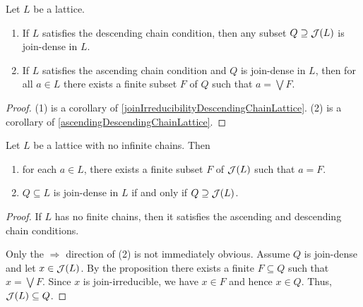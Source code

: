 \begin{proposition}
Let $L$ be a lattice.
\begin{enumerate}
\item If $L$ satisfies the descending chain condition, then any subset $Q\supseteq \mathop{\mathcal{J}}(L)$ is join-dense in $L$.
\item If $L$ satisfies the ascending chain condition and $Q$ is join-dense in $L$, then for all $a\in L$ there exists a finite subset $F$ of $Q$ such that $a = \bigvee F$.
\end{enumerate}
\end{proposition}
\begin{proof}
(1) is a corollary of \ref{joinIrreducibilityDescendingChainLattice}. (2) is a corollary of \ref{ascendingDescendingChainLattice}.
\end{proof}
\begin{corollary}
Let $L$ be a lattice with no infinite chains. Then
\begin{enumerate}
\item for each $a \in L$, there exists a finite subset $F$ of $\mathop{\mathcal{J}}(L)$ such that $a = F$.
\item $Q\subseteq L$ is join-dense in $L$ if and only if $Q \supseteq \mathop{\mathcal{J}}(L)$.
\end{enumerate}
\end{corollary}
\begin{proof}
If $L$ has no finite chains, then it satisfies the ascending and descending chain conditions.

Only the $\Rightarrow$ direction of (2) is not immediately obvious. Assume $Q$ is join-dense and let $x\in \mathop{\mathcal{J}}(L)$. By the proposition there exists a finite $F\subseteq Q$ such that $x = \bigvee F$. Since $x$ is join-irreducible, we have $x \in F$ and hence $x \in Q$. Thus, $\mathop{\mathcal{J}}(L) \subseteq Q$.
\end{proof}


